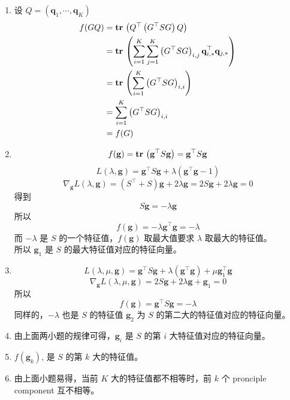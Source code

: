 \documentclass[11pt,letter,notitlepage]{article}
\DeclareMathOperator*{\tr}{\bf tr\,}
\begin{document}
\begin{solution}
    \begin{enumerate}
        \item  设 $Q=(\mathbf{q}_1,\cdots, \mathbf{q}_K)$
        $$\begin{aligned}
            f(GQ)
            &= \tr \left(Q^\top \left(G^\top S G\right) Q\right) \\
            &= \tr \left( \sum_{i=1}^K \sum_{j=1}^{K} \left(G^\top S G\right)_{i,j} \mathbf{q}_{i,*}^\top \mathbf{q}_{j,*} \right) \\
            &= \tr \left( \sum_{i=1}^{K} \left(G^\top S G\right)_{i,i} \right) \\
            &=\sum_{i=1}^{K} \left(G^\top S G\right)_{i,i} \\
            &=f(G)
        \end{aligned}$$
        \item $$f(\mathbf{g})
            =\tr \left( \mathbf{g}^\top S \mathbf{g}\right)
            =\mathbf{g}^\top S \mathbf{g}$$
            $$L(\lambda,\mathbf{g})=\mathbf{g}^\top S \mathbf{g}
            +\lambda(\mathbf{g}^\top \mathbf{g}-1)$$
            $$\nabla_\mathbf{g} L(\lambda,\mathbf{g})
            =\left( S^\top +S \right) \mathbf{g}+2\lambda \mathbf{g}
            =2S \mathbf{g}+2\lambda \mathbf{g}=0$$
            得到
            $$S\mathbf{g}=-\lambda \mathbf{g}$$ 
            所以 $$f(\mathbf{g})=-\lambda \mathbf{g}^\top \mathbf{g}=-\lambda$$
            而 $-\lambda$ 是 $S$ 的一个特征值，$f(\mathbf{g})$ 取最大值要求 $\lambda$ 取最大的特征值。\\
            所以 $\mathbf{g}_1$ 是 $S$ 的最大特征值对应的特征向量。
        \item $$L(\lambda,\mu,\mathbf{g})=\mathbf{g}^\top S \mathbf{g}+\lambda (\mathbf{g}^\top \mathbf{g})+\mu \mathbf{g}_1^\top \mathbf{g}$$
        $$\nabla_\mathbf{g} L(\lambda,\mu,\mathbf{g})
        =2S\mathbf{g}+2\lambda \mathbf{g}+\mathbf{g}_1=0$$
        所以 $$f(\mathbf{g})=\mathbf{g}^\top S\mathbf{g}=-\lambda$$
        同样的，$-\lambda$ 也是 $S$ 的特征值
        $\mathbf{g}_2$ 为 $S$ 的第二大的特征值对应的特征向量。
        \item 由上面两小题的规律可得，$\mathbf{g}_i$ 是 $S$ 的第 $i$ 大特征值对应的特征向量。
        \item $f(\mathbf{g}_k)$, 是 $S$ 的第 $k$ 大的特征值。
        \item 由上面小题易得，当前 $K$ 大的特征值都不相等时，前 $k$ 个 pronciple component 互不相等。
    \end{enumerate}
\end{solution}





\end{document}
